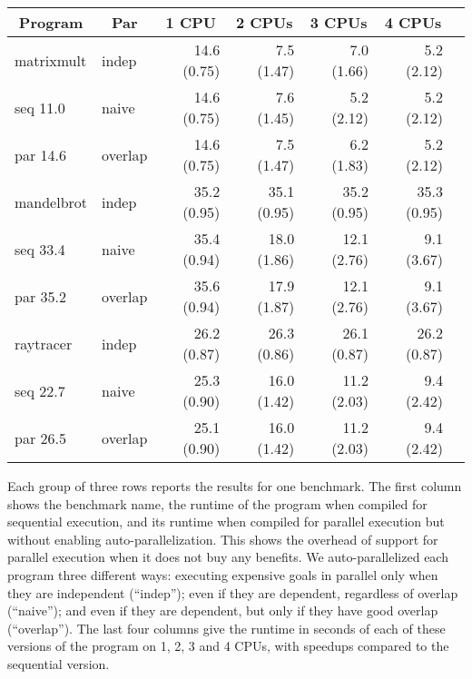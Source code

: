 \begin{table}[tb]
\begin{center}
\begin{tabular}{llrrrrr}
\hline \hline
\multicolumn{1}{c}{\textbf{Program}} &
\multicolumn{1}{c}{\textbf{Par}}    & 
\multicolumn{1}{c}{\textbf{1 CPU}}   & 
\multicolumn{1}{c}{\textbf{2 CPUs}}  & 
\multicolumn{1}{c}{\textbf{3 CPUs}}  & 
\multicolumn{1}{c}{\textbf{4 CPUs}}  \\
\hline
matrixmult & indep    & 14.6 (0.75) &  7.5 (1.47) &  7.0 (1.66) &  5.2 (2.12) \\
seq 11.0   & naive    & 14.6 (0.75) &  7.6 (1.45) &  5.2 (2.12) &  5.2 (2.12) \\
par 14.6   & overlap  & 14.6 (0.75) &  7.5 (1.47) &  6.2 (1.83) &  5.2 (2.12) \\
\hline
mandelbrot & indep    & 35.2 (0.95) & 35.1 (0.95) & 35.2 (0.95) & 35.3 (0.95) \\
seq 33.4   & naive    & 35.4 (0.94) & 18.0 (1.86) & 12.1 (2.76) &  9.1 (3.67) \\
par 35.2   & overlap  & 35.6 (0.94) & 17.9 (1.87) & 12.1 (2.76) &  9.1 (3.67) \\
\hline
raytracer  & indep    & 26.2 (0.87) & 26.3 (0.86) & 26.1 (0.87) & 26.2 (0.87) \\
seq 22.7   & naive    & 25.3 (0.90) & 16.0 (1.42) & 11.2 (2.03) &  9.4 (2.42) \\
par 26.5   & overlap  & 25.1 (0.90) & 16.0 (1.42) & 11.2 (2.03) &  9.4 (2.42) \\
\hline \hline
\end{tabular}
\end{center}
\end{table}

Each group of three rows reports the results for one benchmark.
The first column shows the benchmark name,
the runtime of the program when compiled for sequential execution, and
its runtime when compiled for parallel execution
but without enabling auto-parallelization.
This shows the overhead of support for parallel execution
when it does not buy any benefits.
We auto-parallelized each program three different ways:
executing expensive goals in parallel
only when they are independent (``indep'');
even if they are dependent, regardless of overlap (``naive'');  and
even if they are dependent, but only if they have good overlap (``overlap'').
The last four columns give the runtime in seconds
of each of these versions of the program
on 1, 2, 3 and 4 CPUs,
with speedups compared to the sequential version.

